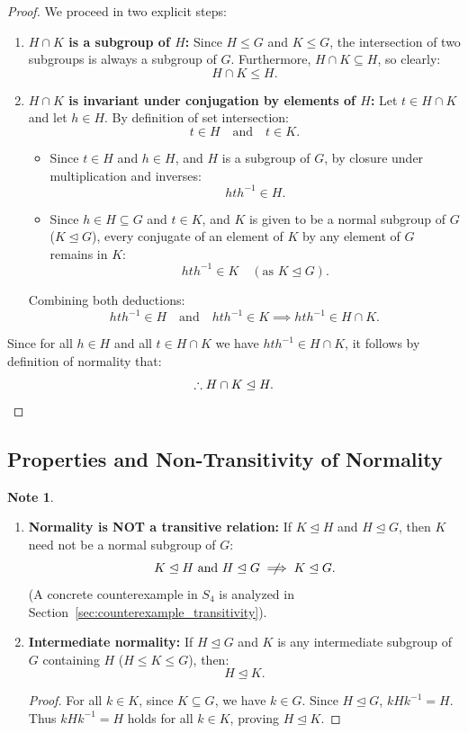 \documentclass[12pt]{article}
\theoremstyle{definition}
\newtheorem*{note}{Note}
\theoremstyle{plain}
\begin{document}
\begin{proof}
We proceed in two explicit steps:
\begin{enumerate}
    \item \textbf{$H \cap K$ is a subgroup of $H$:}
    Since $H \le G$ and $K \le G$, the intersection of two subgroups is always a subgroup of $G$. Furthermore, $H \cap K \subseteq H$, so clearly:
    \[
    H \cap K \le H.
    \]
    
    \item \textbf{$H \cap K$ is invariant under conjugation by elements of $H$:}
    Let $t \in H \cap K$ and let $h \in H$.
    By definition of set intersection:
    \[
    t \in H \quad \text{and} \quad t \in K.
    \]
    \begin{itemize}
        \item Since $t \in H$ and $h \in H$, and $H$ is a subgroup of $G$, by closure under multiplication and inverses:
        \[
        h t h^{-1} \in H.
        \]
        \item Since $h \in H \subseteq G$ and $t \in K$, and $K$ is given to be a normal subgroup of $G$ ($K \trianglelefteq G$), every conjugate of an element of $K$ by any element of $G$ remains in $K$:
        \[
        h t h^{-1} \in K \quad (\text{as } K \trianglelefteq G).
        \]
    \end{itemize}
    Combining both deductions:
    \[
    h t h^{-1} \in H \quad \text{and} \quad h t h^{-1} \in K \implies h t h^{-1} \in H \cap K.
    \]
\end{enumerate}
Since for all $h \in H$ and all $t \in H \cap K$ we have $h t h^{-1} \in H \cap K$, it follows by definition of normality that:
\[
\therefore H \cap K \trianglelefteq H. \qedhere
\]
\end{proof}

\subsection{Properties and Non-Transitivity of Normality}

\begin{note}
\begin{enumerate}
    \item \textbf{Normality is NOT a transitive relation:}
    If $K \trianglelefteq H$ and $H \trianglelefteq G$, then $K$ need not be a normal subgroup of $G$:
    \[
    K \trianglelefteq H \text{ and } H \trianglelefteq G \centernot\implies K \trianglelefteq G.
    \]
    (A concrete counterexample in $S_4$ is analyzed in Section~\ref{sec:counterexample_transitivity}).
    
    \item \textbf{Intermediate normality:}
    If $H \trianglelefteq G$ and $K$ is any intermediate subgroup of $G$ containing $H$ ($H \le K \le G$), then:
    \[
    H \trianglelefteq K.
    \]
    \begin{proof}
    For all $k \in K$, since $K \subseteq G$, we have $k \in G$. Since $H \trianglelefteq G$, $k H k^{-1} = H$. Thus $k H k^{-1} = H$ holds for all $k \in K$, proving $H \trianglelefteq K$.
    \end{proof}
\end{enumerate}
\end{note}
\end{document}
